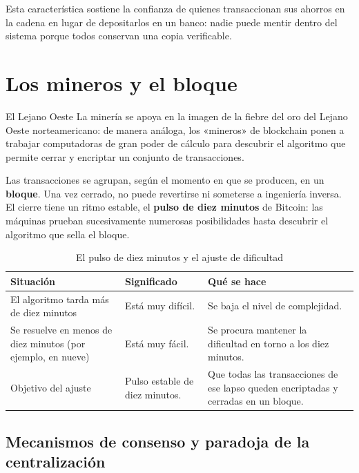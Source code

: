 \documentclass[12pt,oneside]{book}
\begin{document}
Esta característica sostiene la confianza de quienes transaccionan sus ahorros en la cadena en lugar de depositarlos en un banco: nadie puede mentir dentro del sistema porque todos conservan una copia verificable.

\section{Los mineros y el bloque}

\begin{example}{El Lejano Oeste}
La minería se apoya en la imagen de la fiebre del oro del Lejano Oeste norteamericano: de manera análoga, los «mineros» de blockchain ponen a trabajar computadoras de gran poder de cálculo para descubrir el algoritmo que permite cerrar y encriptar un conjunto de transacciones.
\end{example}

Las transacciones se agrupan, según el momento en que se producen, en un \textbf{bloque}. Una vez cerrado, no puede revertirse ni someterse a ingeniería inversa. El cierre tiene un ritmo estable, el \textbf{pulso de diez minutos} de Bitcoin: las máquinas prueban sucesivamente numerosas posibilidades hasta descubrir el algoritmo que sella el bloque.

\begin{table}[H]
\centering
\caption{El pulso de diez minutos y el ajuste de dificultad}
\renewcommand{\arraystretch}{1.2}
\begin{tabularx}{\textwidth}{>{\raggedright\arraybackslash}p{}>{\raggedright\arraybackslash}p{}X}
\toprule
\textbf{Situación} & \textbf{Significado} & \textbf{Qué se hace} \\
\midrule
El algoritmo tarda más de diez minutos & Está muy difícil. & Se baja el nivel de complejidad. \\
Se resuelve en menos de diez minutos (por ejemplo, en nueve) & Está muy fácil. & Se procura mantener la dificultad en torno a los diez minutos. \\
Objetivo del ajuste & Pulso estable de diez minutos. & Que todas las transacciones de ese lapso queden encriptadas y cerradas en un bloque. \\
\bottomrule
\end{tabularx}
\end{table}

\subsection{Mecanismos de consenso y paradoja de la centralización}
\end{document}
